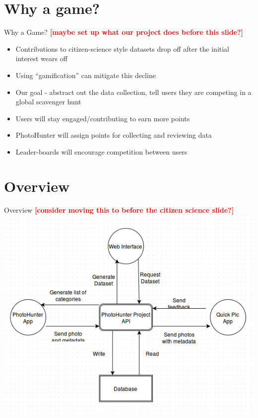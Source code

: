 \documentclass[aspectratio=169]{beamer}
\newcommand{\todo}[1]{\textcolor{red}{\textbf{[#1]}}}
\begin{document}
\section{Why a game?}

\begin{frame}{Why a Game?}
	\todo{maybe set up what our project does before this slide?}
  \begin{itemize}

    \item Contributions to citizen-science style datasets drop off after
          the initial interest wears off

    \item Using ``gamification'' can mitigate this decline

    \item Our goal - abstract out the data collection, tell users they
          are competing in a global scavenger hunt

    \item Users will stay engaged/contributing to earn more points

    \item PhotoHunter will assign points for collecting and reviewing data

    \item Leader-boards will encourage competition between users

  \end{itemize}
\end{frame}

\section{Overview}

\begin{frame}{Overview}
  \centering
	\todo{consider moving this to before the citizen science slide?}
  \includegraphics[width=\textwidth,height=\textheight,keepaspectratio]{ss_flowchart}
\end{frame}
\end{document}
